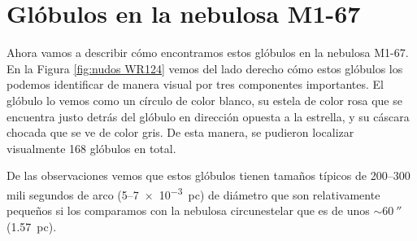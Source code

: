 \documentclass{book}
\begin{document}
\chapter{Glóbulos en la nebulosa M1-67} \label{Chapter : 3}

Ahora vamos a describir cómo encontramos estos glóbulos en la nebulosa M1-67.
En la Figura \ref{fig:nudos WR124} vemos del lado derecho cómo estos glóbulos los podemos identificar de manera visual por tres componentes importantes. El glóbulo lo vemos como un círculo de color blanco,  su estela de color rosa que se encuentra justo detrás del glóbulo en dirección opuesta a la estrella, y su cáscara chocada que se ve de color gris. De esta manera, se pudieron localizar visualmente 168 glóbulos en total.


De las observaciones vemos que estos glóbulos tienen tamaños típicos de 200--300 mili segundos de arco (5--\SI{7e-3}{pc}) de diámetro que son relativamente pequeños si los comparamos con la nebulosa circunestelar que es de unos $\sim\SI{60}{\arcsecond}$ (\SI{1.57}{pc}).
\end{document}
